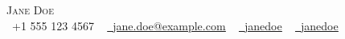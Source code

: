 \begin{center}
    {\Huge \scshape Jane Doe} \\ \vspace{1pt}
    \small \raisebox{-0.1\height}\faPhone\ +1 555 123 4567 ~
    \href{mailto:jane.doe@example.com}{\raisebox{-0.2\height}\faEnvelope\  \underline{jane.doe@example.com}} ~
    \href{https://linkedin.com/in/janedoe/}{\raisebox{-0.2\height}\faLinkedin\ \underline{janedoe}} ~
    \href{https://github.com/janedoe/}{\raisebox{-0.2\height}\faGithub\ \underline{janedoe}}
    \vspace{-8pt}
\end{center}
